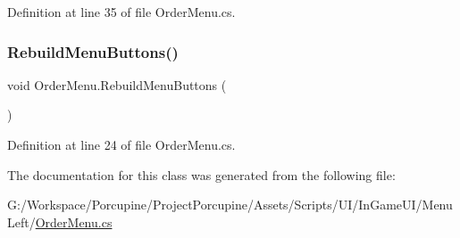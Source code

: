 Definition at line 35 of file Order\+Menu.\+cs.

\mbox{\label{class_order_menu_a0d833194dcbdb65111b072fdc044a329}} 
\subsubsection{\texorpdfstring{Rebuild\+Menu\+Buttons()}{RebuildMenuButtons()}}
{\footnotesize\ttfamily void Order\+Menu.\+Rebuild\+Menu\+Buttons (\begin{DoxyParamCaption}{ }\end{DoxyParamCaption})}



Definition at line 24 of file Order\+Menu.\+cs.



The documentation for this class was generated from the following file\+:\begin{DoxyCompactItemize}
\item 
G\+:/\+Workspace/\+Porcupine/\+Project\+Porcupine/\+Assets/\+Scripts/\+U\+I/\+In\+Game\+U\+I/\+Menu\+Left/\hyperlink{_order_menu_8cs}{Order\+Menu.\+cs}\end{DoxyCompactItemize}
